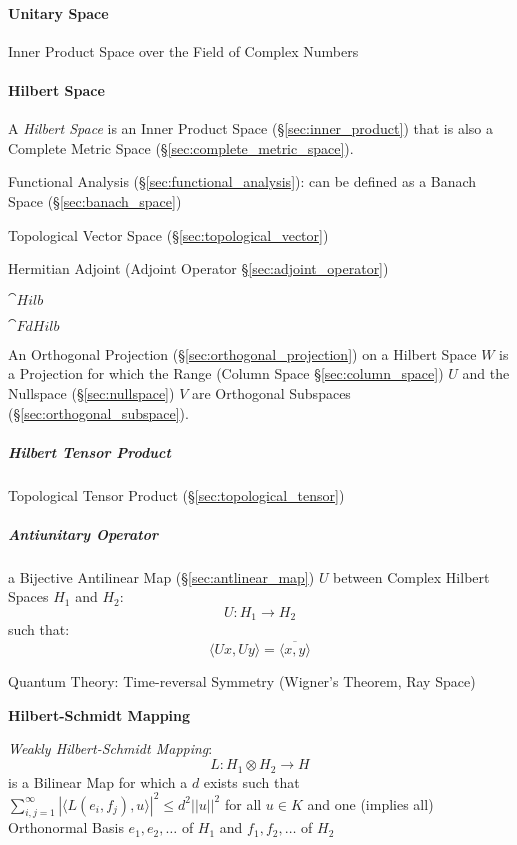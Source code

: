 \paragraph{Unitary Space}\label{sec:unitary_space}\hfill

Inner Product Space over the Field of Complex Numbers



\paragraph{Hilbert Space}\label{sec:hilbert_space}\hfill


A \emph{Hilbert Space} is an Inner Product Space (\S\ref{sec:inner_product})
that is also a Complete Metric Space (\S\ref{sec:complete_metric_space}).

Functional Analysis (\S\ref{sec:functional_analysis}): can be defined
as a Banach Space (\S\ref{sec:banach_space})

Topological Vector Space (\S\ref{sec:topological_vector})

Hermitian Adjoint (Adjoint Operator \S\ref{sec:adjoint_operator})

$\cat{Hilb}$

$\cat{FdHilb}$

An Orthogonal Projection (\S\ref{sec:orthogonal_projection}) on a Hilbert Space
$W$ is a Projection for which the Range (Column Space \S\ref{sec:column_space})
$U$ and the Nullspace (\S\ref{sec:nullspace}) $V$ are Orthogonal Subspaces
(\S\ref{sec:orthogonal_subspace}).



\subparagraph{Hilbert Tensor Product}\label{sec:hilbert_tensor}\hfill

Topological Tensor Product (\S\ref{sec:topological_tensor})



\subparagraph{Antiunitary Operator}\label{sec:antiunitary_operator}\hfill

a Bijective Antilinear Map (\S\ref{sec:antlinear_map}) $U$ between Complex
Hilbert Spaces $H_1$ and $H_2$:
\[
  U : H_1 \rightarrow H_2
\]
such that:
\[
  \langle{Ux,Uy}\rangle = \overline{\langle{x,y}\rangle}
\]

Quantum Theory: Time-reversal Symmetry (Wigner's Theorem, Ray Space) %



\textbf{Hilbert-Schmidt Mapping}

\emph{Weakly Hilbert-Schmidt Mapping}:
\[
  L : H_1 \otimes H_2 \rightarrow H
\]
is a Bilinear Map for which a $d$ exists such that
$\sum_{i,j=1}^\infty | \langle L(e_i,f_j), u \rangle |^2 \leq d^2
||u||^2$ for all $u \in K$ and one (implies all) Orthonormal Basis
$e_1, e_2, \ldots$ of $H_1$ and $f_1, f_2, \ldots$ of $H_2$

